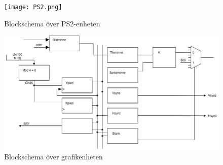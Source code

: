 \documentclass[a4paper,titlepage]{article}
\begin{document}
\begin{figure}[h!]
	\centering
\texttt{[image: PS2.png]}
	\caption{Blockschema över PS2-enheten}
\end{figure}

\begin{figure}[h!]
	\centering
\includegraphics[width=14cm]{vga-schema.png}
	\caption{Blockschema över grafikenheten}
\end{figure}
\end{document}
